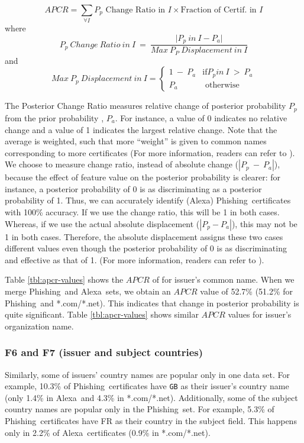 \documentclass[twocolumn]{article}
\newcommand{\Alexa}{\textsf{Alexa}}
\newcommand{\phishing}{\textsf{Phishing}}
\newcommand{\comnet}{\textsf{*.com/*.net}}
\begin{document}
{\footnotesize
$$APCR=\sum_{\forall I}P_p \mbox{ Change Ratio in } I \times \mbox{Fraction of Certif. in } I$$ }
where
{\footnotesize
$$P_p\ Change\ Ratio\ in\ \textit{I}\ =\ \frac{\lvert P_p\ in\ \textit{I} - P_a \rvert}{Max\ P_P\ Displacement\ in\ \textit{I}}$$
}
and
{\footnotesize
$$Max\ P_p\ Displacement\ in\ \textit{I} = \left\{ \begin{array}{rl}
  1\ -\ P_a &\mbox{if} P_p in\ \textit{I}\ >\ P_a \\
  P_a &\mbox{ otherwise}\end{array}\right.$$
 }



The Posterior Change Ratio measures relative change of posterior probability $P_p$ from the prior probability
, $P_a$. For instance, a value of 0 indicates no relative change and a value of 
1 indicates the largest relative change. Note that 
the average is weighted, such that more ``weight'' is given to common names 
corresponding to more certificates  (For more information, readers can refer to \cite{ads-portal-class}). 
We choose to measure change ratio, instead of absolute change 
($|P_p\ -\ P_a|$), because the effect of feature value on the posterior probability is clearer: for 
instance, a posterior probability of 0 is as discriminating as a posterior probability of 1. Thus, we 
can accurately identify (\Alexa) \phishing\ certificates with 100\% accuracy. 
If we use the change ratio, this will be 1 in both cases. Whereas, if we use the actual absolute displacement ($|P_p - P_a|$), this 
may not be 1 in both cases. Therefore, the absolute displacement assigns these two cases different values even though 
the posterior probability of 0 is as discriminating and effective as that of 1. (For more information, readers can refer to \cite{ads-portal-class}).
\fi

Table \ref{tbl:apcr-values} shows the $APCR$ of for issuer's common name. When we merge \phishing\ and \Alexa\ sets, we obtain an $APCR$ value 
of 52.7\% (51.2\% for \phishing\ and \comnet). This indicates that change in posterior probability is quite significant.
Table \ref{tbl:apcr-values} shows similar  $APCR$ values for issuer's organization name. 


\subsubsection*{F6 and F7 (issuer and subject countries)} \noindent
Similarly, some of issuers' country names are popular only in  one data set. For example, 10.3\% of  \phishing\ certificates have {\tt GB} as their issuer's country name
(only 1.4\% in \Alexa\ and 4.3\% in \comnet). Additionally, some of the subject country names are popular only in the \phishing\ set. For example, 5.3\% of  \phishing\ certificates have FR  as their country in the subject field. This happens only in 2.2\% of \Alexa\ certificates (0.9\% in \comnet).
\end{document}
